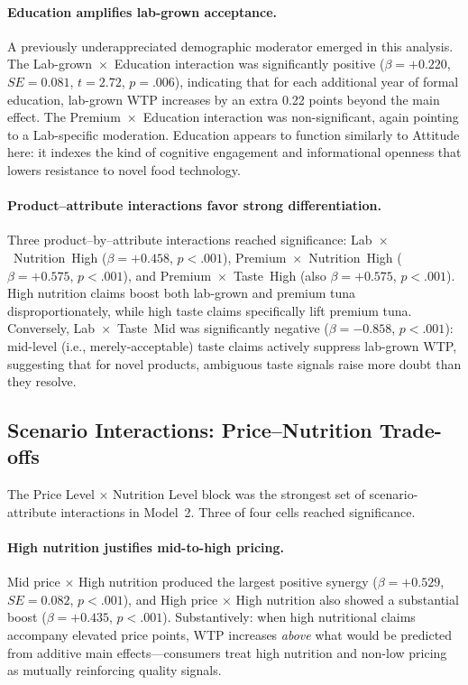 \paragraph{Education amplifies lab-grown acceptance.} A previously underappreciated demographic moderator emerged in this analysis. The Lab-grown~$\times$~Education interaction was significantly positive ($\beta=+0.220$, $SE=0.081$, $t=2.72$, $p=.006$), indicating that for each additional year of formal education, lab-grown WTP increases by an extra 0.22 points beyond the main effect. The Premium~$\times$~Education interaction was non-significant, again pointing to a Lab-specific moderation. Education appears to function similarly to Attitude here: it indexes the kind of cognitive engagement and informational openness that lowers resistance to novel food technology.

\paragraph{Product--attribute interactions favor strong differentiation.} Three product--by--attribute interactions reached significance: Lab~$\times$~Nutrition~High ($\beta=+0.458$, $p<.001$), Premium~$\times$~Nutrition~High ($\beta=+0.575$, $p<.001$), and Premium~$\times$~Taste~High (also $\beta=+0.575$, $p<.001$). High nutrition claims boost both lab-grown and premium tuna disproportionately, while high taste claims specifically lift premium tuna. Conversely, Lab~$\times$~Taste~Mid was significantly negative ($\beta=-0.858$, $p<.001$): mid-level (i.e., merely-acceptable) taste claims actively suppress lab-grown WTP, suggesting that for novel products, ambiguous taste signals raise more doubt than they resolve.

\subsection{Scenario Interactions: Price--Nutrition Trade-offs}\label{subsec:scenario-interactions}

The Price Level $\times$ Nutrition Level block was the strongest set of scenario-attribute interactions in Model~2. Three of four cells reached significance.

\paragraph{High nutrition justifies mid-to-high pricing.} Mid price $\times$ High nutrition produced the largest positive synergy ($\beta=+0.529$, $SE=0.082$, $p<.001$), and High price $\times$ High nutrition also showed a substantial boost ($\beta=+0.435$, $p<.001$). Substantively: when high nutritional claims accompany elevated price points, WTP increases \textit{above} what would be predicted from additive main effects---consumers treat high nutrition and non-low pricing as mutually reinforcing quality signals.


